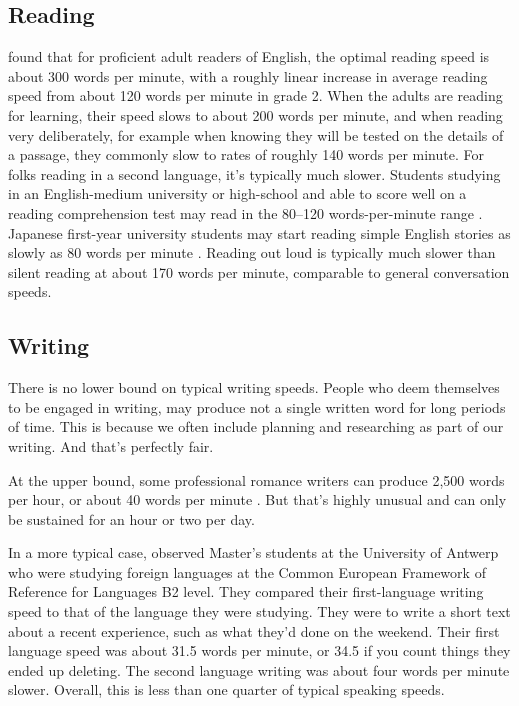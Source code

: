 \subsection{Reading}

\citet{Carver1992} found that for proficient adult readers of English, the optimal reading speed is about 300 words per minute, with a roughly linear increase in average reading speed from about 120 words per minute in grade 2. When the adults are reading for learning, their speed slows to about 200 words per minute, and when reading very deliberately, for example when knowing they will be tested on the details of a passage, they commonly slow to rates of roughly 140 words per minute. For folks reading in a second language, it's typically much slower. Students studying in an English-medium university or high-school and able to score well on a reading comprehension test may read in the 80--120 words-per-minute range \citep[292]{Grabe2009}. Japanese first-year university students may start reading simple English stories as slowly as 80 words per minute \citep{McLean2017}. Reading out loud is typically much slower than silent reading at about 170 words per minute, comparable to general conversation speeds.

\subsection{Writing}

There is no lower bound on typical writing speeds. People who deem themselves to be engaged in writing, may produce not a single written word for long periods of time. This is because we often include planning and researching as part of our writing. And that's perfectly fair.

At the upper bound, some professional romance writers can produce 2,500 words per hour, or about 40 words per minute \citep{Ha2017}. But that's highly unusual and can only be sustained for an hour or two per day.

In a more typical case, \citet{VanWaes2015} observed Master's students at the University of Antwerp who were studying foreign languages at the Common European Framework of Reference for Languages B2 level. They compared their first-language writing speed to that of the language they were studying. They were to write a short text about a recent experience, such as what they'd done on the weekend. Their first language speed was about 31.5 words per minute, or 34.5 if you count things they ended up deleting. The second language writing was about four words per minute slower. Overall, this is less than one quarter of typical speaking speeds.

